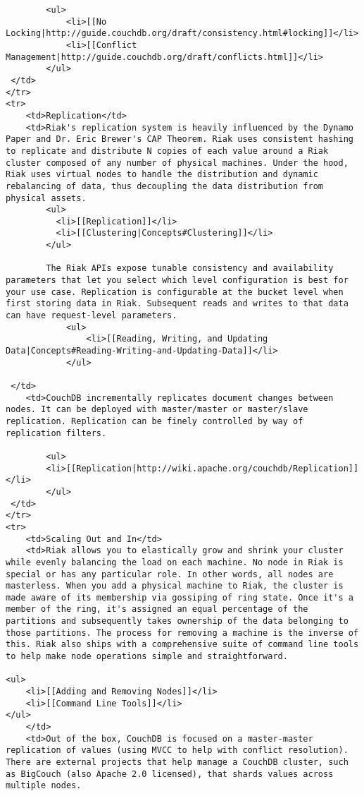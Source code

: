 \documentclass[letter]{book}
\begin{document}
\begin{shaded}
\begin{verbatim}
        <ul>
            <li>[[No Locking|http://guide.couchdb.org/draft/consistency.html#locking]]</li>
            <li>[[Conflict Management|http://guide.couchdb.org/draft/conflicts.html]]</li>
        </ul>
 </td>
</tr>
<tr>
    <td>Replication</td>
    <td>Riak's replication system is heavily influenced by the Dynamo Paper and Dr. Eric Brewer's CAP Theorem. Riak uses consistent hashing to replicate and distribute N copies of each value around a Riak cluster composed of any number of physical machines. Under the hood, Riak uses virtual nodes to handle the distribution and dynamic rebalancing of data, thus decoupling the data distribution from physical assets.
        <ul>
          <li>[[Replication]]</li>
          <li>[[Clustering|Concepts#Clustering]]</li>
        </ul>

        The Riak APIs expose tunable consistency and availability parameters that let you select which level configuration is best for your use case. Replication is configurable at the bucket level when first storing data in Riak. Subsequent reads and writes to that data can have request-level parameters.
            <ul>
                <li>[[Reading, Writing, and Updating Data|Concepts#Reading-Writing-and-Updating-Data]]</li>
            </ul>

 </td>
    <td>CouchDB incrementally replicates document changes between nodes. It can be deployed with master/master or master/slave replication. Replication can be finely controlled by way of replication filters.

        <ul>
        <li>[[Replication|http://wiki.apache.org/couchdb/Replication]]</li>
        </ul>
 </td>
</tr>
<tr>
    <td>Scaling Out and In</td>
    <td>Riak allows you to elastically grow and shrink your cluster while evenly balancing the load on each machine. No node in Riak is special or has any particular role. In other words, all nodes are masterless. When you add a physical machine to Riak, the cluster is made aware of its membership via gossiping of ring state. Once it's a member of the ring, it's assigned an equal percentage of the partitions and subsequently takes ownership of the data belonging to those partitions. The process for removing a machine is the inverse of this. Riak also ships with a comprehensive suite of command line tools to help make node operations simple and straightforward.

<ul>
    <li>[[Adding and Removing Nodes]]</li>
    <li>[[Command Line Tools]]</li>
</ul>
    </td>
    <td>Out of the box, CouchDB is focused on a master-master replication of values (using MVCC to help with conflict resolution). There are external projects that help manage a CouchDB cluster, such as BigCouch (also Apache 2.0 licensed), that shards values across multiple nodes.


\end{verbatim}
\end{shaded}
\end{document}
